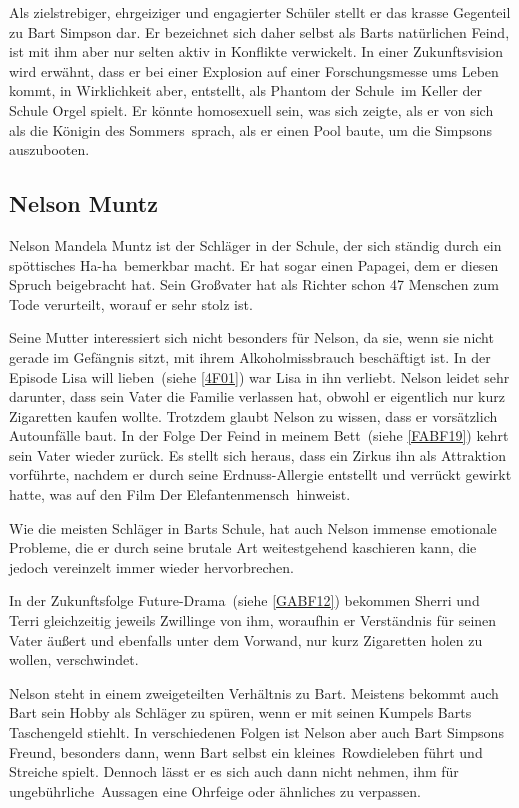 Als zielstrebiger, ehrgeiziger und engagierter Schüler stellt er das krasse Gegenteil zu Bart Simpson dar. Er bezeichnet sich daher selbst als \glqq Barts natürlichen Feind\grqq , ist mit ihm aber nur selten aktiv in Konflikte verwickelt. In einer Zukunftsvision wird erwähnt, dass er bei einer Explosion auf einer Forschungsmesse ums Leben kommt, in Wirklichkeit aber, entstellt, als \glqq Phantom der Schule\grqq\ im Keller der Schule Orgel spielt. Er könnte homosexuell sein, was sich zeigte, als er von sich als \glqq die Königin des Sommers\grqq\ sprach, als er einen Pool baute, um die Simpsons auszubooten.

 
\subsection{Nelson Muntz}\label{NelsonMuntz}
Nelson Mandela Muntz ist der Schläger in der Schule, der sich ständig durch ein spött\-isch\-es \glqq Ha-ha\grqq\ bemerkbar macht. Er hat sogar einen Papagei, dem er diesen Spruch beigebracht hat. Sein Großvater hat als Richter schon 47 Menschen zum Tode verurteilt, worauf er sehr stolz ist.

Seine Mutter interessiert sich nicht besonders für Nelson, da sie, wenn sie nicht gerade im Gefängnis sitzt, mit ihrem Alkoholmissbrauch beschäftigt ist. In der Episode \glqq Lisa will lieben\grqq\ (siehe \ref{4F01}) war Lisa in ihn verliebt. Nelson leidet sehr darunter, dass sein Vater die Familie verlassen hat, obwohl er eigentlich nur kurz Zigaretten kaufen wollte. Trotzdem glaubt Nelson zu wissen, dass er vorsätzlich Autounfälle baut. In der Folge \glqq Der Feind in meinem Bett\grqq\ (siehe \ref{FABF19}) kehrt sein Vater wieder zurück. Es stellt sich heraus, dass ein Zirkus ihn als Attraktion vorführte, nachdem er durch seine Erdnuss-Allergie entstellt und verrückt gewirkt hatte, was auf den Film \glqq Der Elefantenmensch\grqq\ hinweist.

Wie die meisten Schläger in Barts Schule, hat auch Nelson immense emotionale Probleme, die er durch seine brutale Art weitestgehend kaschieren kann, die jedoch vereinzelt immer wieder hervorbrechen.

In der Zukunftsfolge \glqq Future-Drama\grqq\ (siehe \ref{GABF12}) bekommen Sherri und Terri gleichzeitig jeweils Zwillinge von ihm, woraufhin er Verständnis für seinen Vater äußert und ebenfalls unter dem Vorwand, nur kurz Zigaretten holen zu wollen, verschwindet.

Nelson steht in einem zweigeteilten Verhältnis zu Bart. Meistens bekommt auch Bart sein Hobby als Schläger zu spüren, wenn er mit seinen Kumpels Barts Taschengeld stiehlt. In verschiedenen Folgen ist Nelson aber auch Bart Simpsons Freund, besonders dann, wenn Bart selbst ein \glqq kleines\grqq\ Rowdieleben führt und Streiche spielt. Dennoch lässt er es sich auch dann nicht nehmen, ihm für \glqq ungebührliche\grqq\ Aussagen eine Ohrfeige oder ähnliches zu verpassen.

